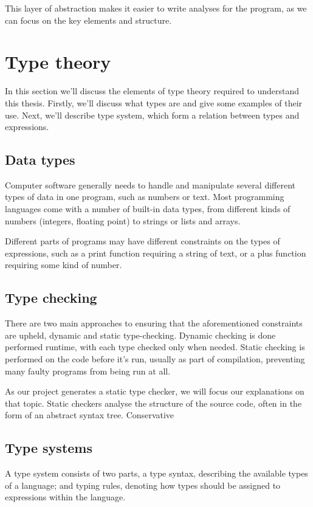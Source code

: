 \documentclass[nofilelist]{cslthse-msc}
\begin{document}
This layer of abstraction makes it easier to write analyses for the program, as we can focus on the key elements and structure.

\section{Type theory}
In this section we'll discuss the elements of type theory required to understand this thesis.
Firstly, we'll discuss what types are and give some examples of their use.
Next, we'll describe type system, which form a relation between types and expressions.

\subsection{Data types}
Computer software generally needs to handle and manipulate several different types of data in one program, such as numbers or text.
Most programming languages come with a number of built-in data types, from different kinds of numbers (integers, floating point) to strings or lists and arrays.

Different parts of programs may have different constraints on the types of expressions, such as a print function requiring a string of text, or a plus function requiring some kind of number.

\subsection{Type checking}
There are two main approaches to ensuring that the aforementioned constraints are upheld, dynamic and static type-checking.
Dynamic checking is done performed runtime, with each type checked only when needed.
Static checking is performed on the code before it's run, usually as part of compilation, preventing many faulty programs from being run at all.

As our project generates a static type checker, we will focus our explanations on that topic.
Static checkers analyse the structure of the source code, often in the form of an abstract syntax tree.
Conservative

\subsection{Type systems}
A type system consists of two parts, a type syntax, describing the available types of a language; and typing rules, denoting how types should be assigned to expressions within the language.
\end{document}
